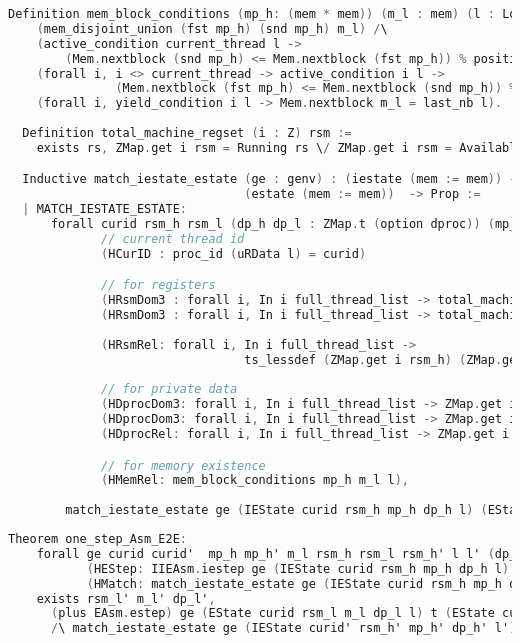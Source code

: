 \begin{lstlisting}[language=C]
  Definition mem_block_conditions (mp_h: (mem * mem)) (m_l : mem) (l : Log) : Prop :=
    (mem_disjoint_union (fst mp_h) (snd mp_h) m_l) /\
    (active_condition current_thread l -> 
        (Mem.nextblock (snd mp_h) <= Mem.nextblock (fst mp_h)) % positive) /\
    (forall i, i <> current_thread -> active_condition i l -> 
               (Mem.nextblock (fst mp_h) <= Mem.nextblock (snd mp_h)) % positive) /\
    (forall i, yield_condition i l -> Mem.nextblock m_l = last_nb l).
  
  Definition total_machine_regset (i : Z) rsm :=
    exists rs, ZMap.get i rsm = Running rs \/ ZMap.get i rsm = Available.

  Inductive match_iestate_estate (ge : genv) : (iestate (mem := mem)) -> 
                                 (estate (mem := mem))  -> Prop :=  
  | MATCH_IESTATE_ESTATE:
      forall curid rsm_h rsm_l (dp_h dp_l : ZMap.t (option dproc)) (mp_h: (mem * mem)) m_l l
             // current thread id 
             (HCurID : proc_id (uRData l) = curid)

             // for registers 
             (HRsmDom3 : forall i, In i full_thread_list -> total_machine_regset i rsm_h)
             (HRsmDom3 : forall i, In i full_thread_list -> total_machine_regset i rsm_l)
             
             (HRsmRel: forall i, In i full_thread_list ->
                                 ts_lessdef (ZMap.get i rsm_h) (ZMap.get i rsm_l))
             
             // for private data 
             (HDprocDom3: forall i, In i full_thread_list -> ZMap.get i dp_h <> None)
             (HDprocDom3: forall i, In i full_thread_list -> ZMap.get i dp_l <> None)
             (HDprocRel: forall i, In i full_thread_list -> ZMap.get i dp_h = ZMap.get i dp_l)

             // for memory existence 
             (HMemRel: mem_block_conditions mp_h m_l l),
        
        match_iestate_estate ge (IEState curid rsm_h mp_h dp_h l) (EState curid rsm_l m_l dp_l l).
\end{lstlisting}

\begin{lstlisting}[language=C]
  Theorem one_step_Asm_E2E:
    forall ge curid curid'  mp_h mp_h' m_l rsm_h rsm_l rsm_h' l l' (dp_h dp_l dp_h' : ZMap.t (option dproc)) t
           (HEStep: IIEAsm.iestep ge (IEState curid rsm_h mp_h dp_h l) t (IEState curid' rsm_h' mp_h' dp_h' l'))
           (HMatch: match_iestate_estate ge (IEState curid rsm_h mp_h dp_h l) (EState curid rsm_l m_l dp_l l)),
    exists rsm_l' m_l' dp_l',
      (plus EAsm.estep) ge (EState curid rsm_l m_l dp_l l) t (EState curid' rsm_l' m_l' dp_l' l')
      /\ match_iestate_estate ge (IEState curid' rsm_h' mp_h' dp_h' l') (EState curid' rsm_l' m_l' dp_l' l').
\end{lstlisting}

